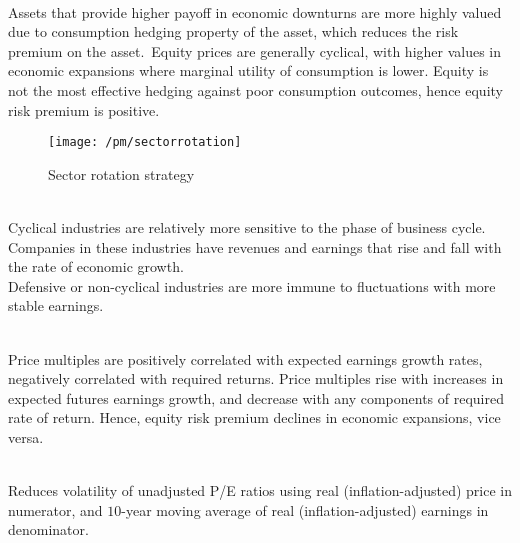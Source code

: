 \begin{remark} \\
Assets that provide higher payoff in economic downturns are more highly valued due to consumption hedging property of the asset, which reduces the risk premium on the asset.\
Equity prices are generally cyclical, with higher values in economic expansions where marginal utility of consumption is lower. Equity is not the most effective hedging against poor consumption outcomes, hence equity risk premium is positive.
\end{remark}

\begin{figure}[H]
\centering
\texttt{[image: /pm/sectorrotation]}
\caption{Sector rotation strategy}
\end{figure}

\begin{remark} \\
Cyclical industries are relatively more sensitive to the phase of business cycle. Companies in these industries have revenues and earnings that rise and fall with the rate of economic growth.\\
Defensive or non-cyclical industries are more immune to fluctuations with more stable earnings.
\end{remark}

\begin{remark} \\
Price multiples are positively correlated with expected earnings growth rates, negatively correlated with required returns. Price multiples rise with increases in expected futures earnings growth, and decrease with any components of required rate of return. Hence, equity risk premium declines in economic expansions, vice versa.
\end{remark}

\begin{remark} \\
Reduces volatility of unadjusted P/E ratios using real (inflation-adjusted) price in numerator, and $10$-year moving average of real (inflation-adjusted) earnings in denominator.
\end{remark}

